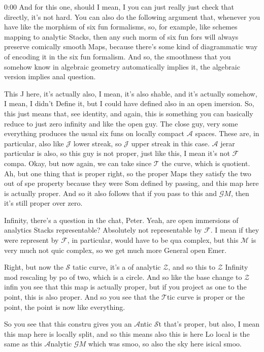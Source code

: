 \begin{unfinished}{0:00}
And for this one, should I mean, I you can just really just check that directly, it's not hard. You can also do the following argument that, whenever you have like the morphism of six fun formalisms, so, for example, like schemes mapping to analytic Stacks, then any such morm of six fun fors will always preserve comically smooth Maps, because there's some kind of diagrammatic way of encoding it in the six fun formalism. And so, the smoothness that you somehow know in algebraic geometry automatically implies it, the algebraic version implies anal question.

This J here, it's actually also, I mean, it's also shable, and it's actually somehow, I mean, I didn't Define it, but I could have defined also in an open imersion. So, this just means that, see identity, and again, this is something you can basically reduce to just zero infinity and like the open guy.
The close guy, very some everything produces the usual six funs on locally compact $\mathcal{A}$ spaces. These are, in particular, also like $\mathcal{J}$ lower streak, so $\mathcal{J}$ upper streak in this case. $\mathcal{A}$ jerar particular is also, so this guy is not proper, just like this, I mean it's not $\mathcal{F}$ compa. Okay, but now again, we can take since $\mathcal{T}$ the curve, which is quotient. Ah, but one thing that is proper right, so the proper Maps they satisfy the two out of spe property because they were Som defined by passing, and this map here is actually proper. And so it also follows that if you pass to this and $\mathcal{G}M$, then it's still proper over zero.

Infinity, there's a question in the chat, Peter. Yeah, are open immersions of analytics Stacks representable? Absolutely not representable by $\mathcal{F}$. I mean if they were represent by $\mathcal{F}$, in particular, would have to be qua complex, but this $\mathcal{M}$ is very much not quic complex, so we get much more General open Emer.

Right, but now the $\mathcal{S}$ tatic curve, it's a of analytic $\mathcal{Z}$, and so this to $\mathcal{Z}$ Infinity mod rescaling by po of two, which is a circle. And so like the base change to $\mathcal{Z}$ infin you see that this map is actually proper, but if you project as one to the point, this is also proper. And so you see that the $\mathcal{T}$tic curve is proper or the point, the point is now like everything.

So you see that this constru gives you an $\mathcal{A}$ntic $\mathcal{S}$t that's proper, but also, I mean this map here is locally split, and so this means also this is here Lo local is the same as this $\mathcal{A}$nalytic $\mathcal{G}M$ which was smoo, so also the sky here isical smoo.


\end{unfinished}
